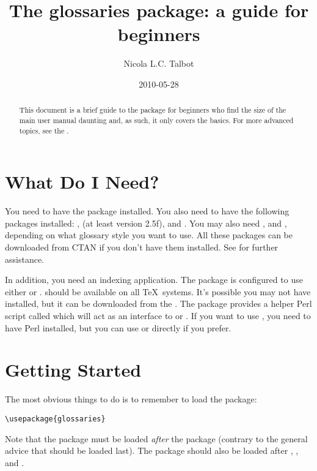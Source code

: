 \documentclass{nlctdoc}
\title{The glossaries package: a guide for beginners}
\author{Nicola L.C. Talbot}
\date{2010-05-28}
\begin{document}
\maketitle

\begin{abstract}
This document is a brief guide to the  package for
beginners who find the size of the main user manual daunting and, as
such, it only covers the basics. For more advanced topics, see the
.
\end{abstract}

\tableofcontents

\section{What Do I Need?}
\label{requirements}

You need to have the  package installed. You also
need to have the following packages installed: ,
 (at least version 2.5f),  and .
You may also need ,  and
, depending on what glossary style you want to use. All
these packages can be downloaded from CTAN if you don't have them
installed. See
 for further assistance.

In addition, you need an indexing application. The 
package is configured to use either  or .
 should be available on all \TeX\ systems. It's
possible you may not have  installed, but it can be
downloaded from the . The  package provides a helper Perl script
called  which will act as an interface to
 or . If you want to use
, you need to have Perl installed, but you can
use  or  directly if you prefer.

\section{Getting Started}
\label{start}

The most obvious things to do is to remember to load the 
 package:
\begin{verbatim}
\usepackage{glossaries}
\end{verbatim}
Note that the  package must be loaded \emph{after}
the  package (contrary to the general advice that
 should be loaded last). The  package 
should also be loaded after , ,
 and .
\end{document}
